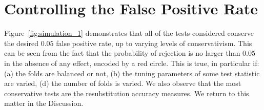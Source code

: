 \documentclass[12pt,a4paper]{article}
\theoremstyle{definition}
\begin{document}
\section{Controlling the False Positive Rate}
\label{sec:type_i}

Figure~\ref{fig:simulation_1} demonstrates that all of the tests considered conserve the desired $0.05$ false positive rate, up to varying levels of conservativism.
This can be seen from the fact that the probability of rejection is no larger than $0.05$ in the absence of any effect, encoded by a red circle. 
This is true, in particular if:
(a) the folds are balanced or not,
(b) the tuning parameters of some test statistic are varied,
(d) the number of folds is varied.
We also observe that the most conservative tests are the resubstitution accuracy measures. 
We return to this matter in the Discussion.
\end{document}
